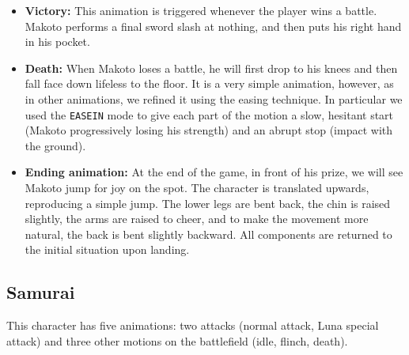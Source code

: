 \begin{itemize}
    \item \textbf{Victory:} This animation is triggered whenever the player wins a battle. Makoto performs a final sword slash at nothing, and then puts his right hand in his pocket.
    
    \item \textbf{Death:} When Makoto loses a battle, he will first drop to his knees and then fall face down lifeless to the floor. It is a very simple animation, however, as in other animations, we refined it using the easing technique. In particular we used the \texttt{EASEIN} mode to give each part of the motion a slow, hesitant start (Makoto progressively losing his strength) and an abrupt stop (impact with the ground).
    
    \item \textbf{Ending animation:} At the end of the game, in front of his prize, we will see Makoto jump for joy on the spot. The character is translated upwards, reproducing a simple jump. The lower legs are bent back, the chin is raised slightly, the arms are raised to cheer, and to make the movement more natural, the back is bent slightly backward. All components are returned to the initial situation upon landing.

\end{itemize}



\subsection{Samurai}

This character has five animations: two attacks (normal attack, Luna special attack) and three other motions on the battlefield (idle, flinch, death).

